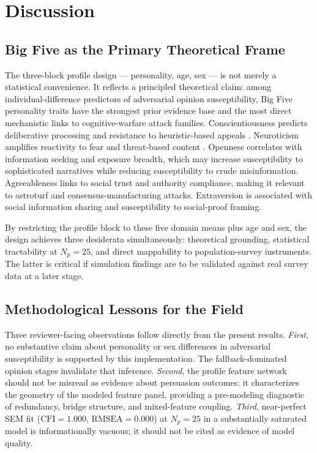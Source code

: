 \documentclass[11pt,a4paper]{article}
\begin{document}
\section{Discussion}

\subsection{Big Five as the Primary Theoretical Frame}

The three-block profile design — personality, age, sex — is not merely a statistical convenience. It reflects a principled theoretical claim: among individual-difference predictors of adversarial opinion susceptibility, Big Five personality traits have the strongest prior evidence base and the most direct mechanistic links to cognitive-warfare attack families. Conscientiousness predicts deliberative processing and resistance to heuristic-based appeals \citep{pennycook2019lazy}. Neuroticism amplifies reactivity to fear and threat-based content \citep{lewandowsky2017posttruth}. Openness correlates with information seeking and exposure breadth, which may increase susceptibility to sophisticated narratives while reducing susceptibility to crude misinformation. Agreeableness links to social trust and authority compliance, making it relevant to astroturf and consensus-manufacturing attacks. Extraversion is associated with social information sharing and susceptibility to social-proof framing.

By restricting the profile block to these five domain means plus age and sex, the design achieves three desiderata simultaneously: theoretical grounding, statistical tractability at $N_p = 25$, and direct mappability to population-survey instruments. The latter is critical if simulation findings are to be validated against real survey data at a later stage.

\subsection{Methodological Lessons for the Field}

Three reviewer-facing observations follow directly from the present results. \emph{First}, no substantive claim about personality or sex differences in adversarial susceptibility is supported by this implementation. The fallback-dominated opinion stages invalidate that inference. \emph{Second}, the profile feature network should not be misread as evidence about persuasion outcomes: it characterizes the geometry of the modeled feature panel, providing a pre-modeling diagnostic of redundancy, bridge structure, and mixed-feature coupling. \emph{Third}, near-perfect SEM fit ($\mathrm{CFI} = 1.000$, $\mathrm{RMSEA} = 0.000$) at $N_p = 25$ in a substantially saturated model is informationally vacuous; it should not be cited as evidence of model quality.
\end{document}
